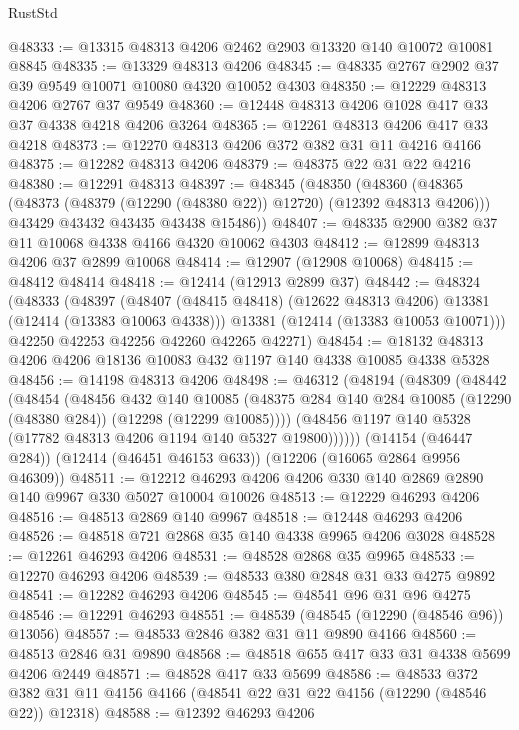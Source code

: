 \begin{lexlean}{RustStd}
\begin{coremodule}
{\begin{coremodule}
{{{{{{{{{{{{{{{{{{{{{{{{{{{{{{{{{{{{{{{{{{{{{{{{{{@48333 := @13315 @48313 @4206 @2462 @2903 @13320 @140 @10072 @10081 @8845
@48335 := @13329 @48313 @4206
@48345 := @48335 @2767 @2902 @37 @39 @9549 @10071 @10080 @4320 @10052 @4303
@48350 := @12229 @48313 @4206 @2767 @37 @9549
@48360 := @12448 @48313 @4206 @1028 @417 @33 @37 @4338 @4218 @4206 @3264
@48365 := @12261 @48313 @4206 @417 @33 @4218
@48373 := @12270 @48313 @4206 @372 @382 @31 @11 @4216 @4166
@48375 := @12282 @48313 @4206
@48379 := @48375 @22 @31 @22 @4216
@48380 := @12291 @48313
@48397 := @48345
    (@48350
      (@48360
        (@48365 (@48373 (@48379 (@12290 (@48380 @22)) @12720) (@12392 @48313 @4206)))
        @43429
        @43432
        @43435
        @43438
        @15486))
@48407 := @48335 @2900 @382 @37 @11 @10068 @4338 @4166 @4320 @10062 @4303
@48412 := @12899 @48313 @4206 @37 @2899 @10068
@48414 := @12907 (@12908 @10068)
@48415 := @48412 @48414
@48418 := @12414 (@12913 @2899 @37)
@48442 := @48324
    (@48333
      (@48397
        (@48407 (@48415 @48418) (@12622 @48313 @4206) @13381 (@12414 (@13383 @10063 @4338)))
        @13381
        (@12414 (@13383 @10053 @10071)))
      @42250
      @42253
      @42256
      @42260
      @42265
      @42271)
@48454 := @18132 @48313 @4206 @4206 @18136 @10083 @432 @1197 @140 @4338 @10085 @4338 @5328
@48456 := @14198 @48313 @4206
@48498 := @46312
    (@48194
      (@48309
        (@48442
          (@48454
            (@48456
              @432
              @140
              @10085
              (@48375 @284 @140 @284 @10085 (@12290 (@48380 @284)) (@12298 (@12299 @10085))))
            (@48456 @1197 @140 @5328 (@17782 @48313 @4206 @1194 @140 @5327 @19800))))))
    (@14154 (@46447 @284))
    (@12414 (@46451 @46153 @633))
    (@12206 (@16065 @2864 @9956 @46309))
@48511 := @12212 @46293 @4206 @4206 @330 @140 @2869 @2890 @140 @9967 @330 @5027 @10004 @10026
@48513 := @12229 @46293 @4206
@48516 := @48513 @2869 @140 @9967
@48518 := @12448 @46293 @4206
@48526 := @48518 @721 @2868 @35 @140 @4338 @9965 @4206 @3028
@48528 := @12261 @46293 @4206
@48531 := @48528 @2868 @35 @9965
@48533 := @12270 @46293 @4206
@48539 := @48533 @380 @2848 @31 @33 @4275 @9892
@48541 := @12282 @46293 @4206
@48545 := @48541 @96 @31 @96 @4275
@48546 := @12291 @46293
@48551 := @48539 (@48545 (@12290 (@48546 @96)) @13056)
@48557 := @48533 @2846 @382 @31 @11 @9890 @4166
@48560 := @48513 @2846 @31 @9890
@48568 := @48518 @655 @417 @33 @31 @4338 @5699 @4206 @2449
@48571 := @48528 @417 @33 @5699
@48586 := @48533
    @372
    @382
    @31
    @11
    @4156
    @4166
    (@48541 @22 @31 @22 @4156 (@12290 (@48546 @22)) @12318)
@48588 := @12392 @46293 @4206
}}}}}}}}}}}}}}}}}}}}}}}}}}}}}}}}}}}}}}}}}}}}}}}}}}
\end{coremodule}}
\end{coremodule}
\end{lexlean}
